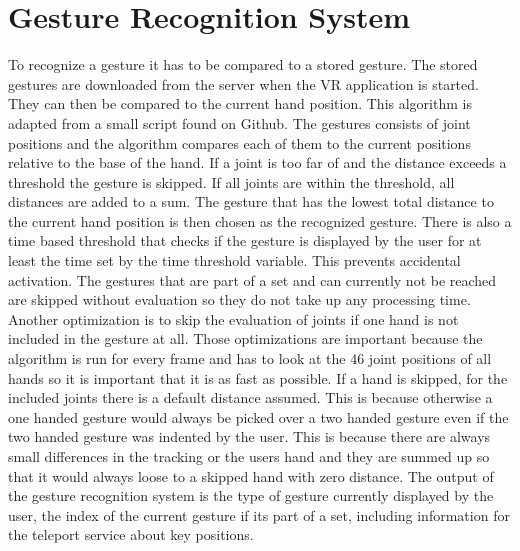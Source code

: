 


\section{Gesture Recognition System}
To recognize a gesture it has to be compared to a stored gesture. The stored gestures are downloaded from the server when the VR application is started. They can then be compared to the current hand position. This algorithm is adapted from a small script found on Github.  %
The gestures consists of joint positions and the algorithm compares each of them to the current positions relative to the base of the hand. If a joint is too far of and the distance exceeds a threshold the gesture is skipped. If all joints are within the threshold, all distances are added to a sum. The gesture that has the lowest total distance to the current hand position is then chosen as the recognized gesture. There is also a time based threshold that checks if the gesture is displayed by the user for at least the time set by the time threshold variable. This prevents accidental activation. The gestures that are part of a set and can currently not be reached are skipped without evaluation so they do not take up any processing time. Another optimization is to skip the evaluation of joints if one hand is not included in the gesture at all. Those optimizations are important because the algorithm is run for every frame and has to look at the 46 joint positions of all hands so it is important that it is as fast as possible.
If a hand is skipped, for the included joints there is a default distance assumed. This is because otherwise a one handed gesture would always be picked over a two handed gesture even if the two handed gesture was indented by the user. This is because there are always small differences in the tracking or the users hand and they are summed up so that it would always loose to a skipped hand with zero distance. 
The output of the gesture recognition system is the type of gesture currently displayed by the user, the index of the current gesture if its part of a set, including information for the teleport service about key positions.

